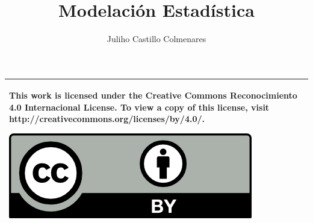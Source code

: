 \documentclass[
]{tufte-book}
\title{Modelación Estadística}
\author{Juliho Castillo Colmenares}
\begin{document}
	\maketitle
\begin{tabular}{|p{}|}
	\hline
	This work is licensed under the Creative Commons Reconocimiento 4.0 Internacional License. To view a copy of this license, visit
	http://creativecommons.org/licenses/by/4.0/.
	\begin{center}
		\includegraphics[scale=1]{./licencia/by.png}
	\end{center}\\
	\hline
\end{tabular}
\tableofcontents









\end{document}
